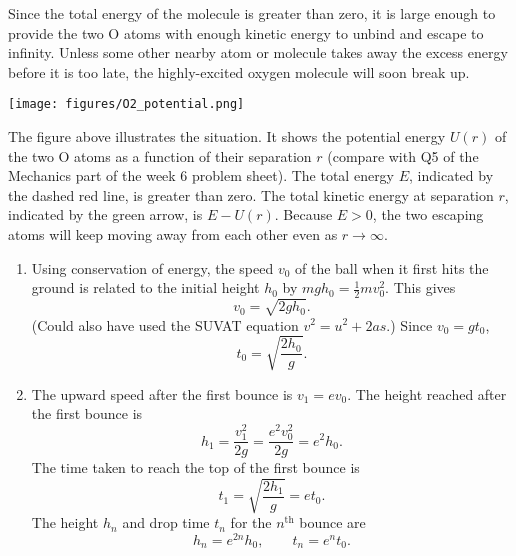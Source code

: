 \documentclass[12pt]{article}
\begin{document}
\begin{enumerate}
\begin{enumerate}
        Since the total energy of the molecule is greater than zero, it
        is large enough to provide the two O atoms with enough kinetic
        energy to unbind and escape to infinity. Unless some other
        nearby atom or molecule takes away the excess energy before it
        is too late, the highly-excited oxygen molecule will soon break
        up.

        \begin{center}
          \texttt{[image: figures/O2\_potential.png]}
        \end{center}

        The figure above illustrates the situation. It shows the
        potential energy $U(r)$ of the two O atoms as a function of
        their separation $r$ (compare with Q5 of the Mechanics part of
        the week 6 problem sheet). The total energy $E$, indicated by
        the dashed red line, is greater than zero. The total kinetic
        energy at separation $r$, indicated by the green arrow, is $E -
        U(r)$. Because $E > 0$, the two escaping atoms will keep moving
        away from each other even as $r \rightarrow \infty$.
        
  \end{enumerate}
  
    \begin{enumerate}
    
    \item Using conservation of energy, the speed $v_0$ of the ball when
      it first hits the ground is related to the initial height $h_0$ by
      $mgh_0 = \frac{1}{2}mv_0^2$. This gives
      \begin{displaymath}
        v_0 = \sqrt{2gh_0}.
      \end{displaymath}
      (Could also have used the SUVAT equation $v^2 = u^2 + 2as$.) Since
      $v_0 = g t_0$,
      \begin{displaymath}
        t_0 = \sqrt{\frac{2h_0}{g}}.
      \end{displaymath}

    \item The upward speed after the first bounce is $v_1 = ev_0$. The
      height reached after the first bounce is
      \begin{displaymath}
        h_1 = \frac{v_1^2}{2g} = \frac{e^2 v_0^2}{2g}
        = e^2 h_0.
      \end{displaymath}
      The time taken to reach the top of the first bounce is
      \begin{displaymath}
        t_1 = \sqrt{\frac{2h_1}{g}} = et_0.
      \end{displaymath}
      The height $h_n$ and drop time $t_n$ for the $n^{\text{th}}$ bounce
      are
      \begin{displaymath}
        h_n = e^{2n} h_0, \qquad t_n = e^n t_0.
      \end{displaymath}
    

\end{enumerate}
\end{enumerate}
\end{document}
